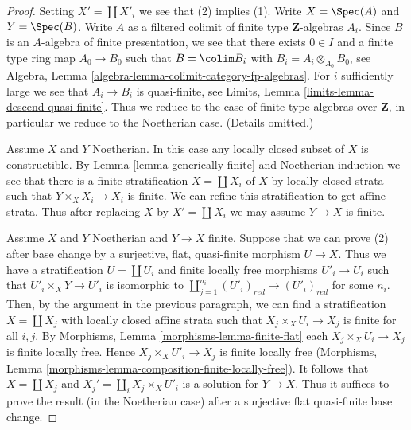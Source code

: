 \begin{proof}
Setting $X' = \coprod X'_i$ we see that (2) implies (1).
Write $X = \Spec(A)$ and $Y = \Spec(B)$. Write $A$ as a filtered colimit
of finite type $\mathbf{Z}$-algebras $A_i$. Since $B$ is an $A$-algebra of
finite presentation, we see that there exists $0 \in I$ and a
finite type ring map $A_0 \to B_0$ such that $B = \colim B_i$ with
$B_i = A_i \otimes_{A_0} B_0$, see
Algebra, Lemma \ref{algebra-lemma-colimit-category-fp-algebras}.
For $i$ sufficiently large we see that $A_i \to B_i$ is
quasi-finite, see Limits, Lemma \ref{limits-lemma-descend-quasi-finite}.
Thus we reduce to the case of finite type algebras over $\mathbf{Z}$,
in particular we reduce to the Noetherian case. (Details omitted.)

\medskip\noindent
Assume $X$ and $Y$ Noetherian. In this case any locally closed
subset of $X$ is constructible. By Lemma \ref{lemma-generically-finite}
and Noetherian induction we see that
there is a finite stratification $X = \coprod X_i$ of $X$
by locally closed strata such that $Y \times_X X_i \to X_i$ is finite.
We can refine this stratification to get affine strata.
Thus after replacing $X$ by $X' = \coprod X_i$ we may assume
$Y \to X$ is finite.

\medskip\noindent
Assume $X$ and $Y$ Noetherian and $Y \to X$ finite.
Suppose that we can prove (2) after base change by a surjective,
flat, quasi-finite morphism $U \to X$. Thus we have a stratification
$U = \coprod U_i$ and finite locally free morphisms $U'_i \to U_i$
such that $U'_i \times_X Y \to U'_i$ is isomorphic to
$\coprod_{j = 1}^{n_i} (U'_i)_{red} \to (U'_i)_{red}$ for some $n_i$.
Then, by the argument in the previous paragraph, we can find a
stratification $X = \coprod X_j$ with locally closed affine strata such that
$X_j \times_X U_i \to X_j$ is finite for all $i, j$. By
Morphisms, Lemma \ref{morphisms-lemma-finite-flat}
each $X_j \times_X U_i \to X_j$ is finite locally free.
Hence $X_j \times_X U'_i \to X_j$ is finite locally free
(Morphisms, Lemma \ref{morphisms-lemma-composition-finite-locally-free}).
It follows that $X = \coprod X_j$ and $X_j' = \coprod_i X_j \times_X U'_i$
is a solution for $Y \to X$. Thus it suffices to prove
the result (in the Noetherian case) after a surjective flat quasi-finite
base change.


\end{proof}
